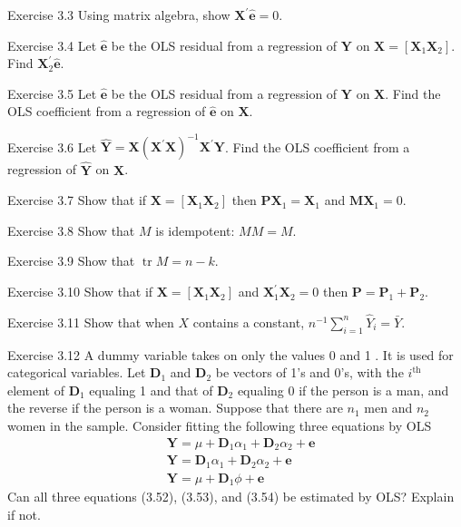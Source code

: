\documentclass[10pt]{article}
\begin{document}
Exercise 3.3 Using matrix algebra, show $\boldsymbol{X}^{\prime} \widehat{\boldsymbol{e}}=0$.

Exercise 3.4 Let $\widehat{\boldsymbol{e}}$ be the OLS residual from a regression of $\boldsymbol{Y}$ on $\boldsymbol{X}=\left[\boldsymbol{X}_{1} \boldsymbol{X}_{2}\right]$. Find $\boldsymbol{X}_{2}^{\prime} \widehat{\boldsymbol{e}}$.

Exercise 3.5 Let $\widehat{\boldsymbol{e}}$ be the OLS residual from a regression of $\boldsymbol{Y}$ on $\boldsymbol{X}$. Find the OLS coefficient from a regression of $\widehat{\boldsymbol{e}}$ on $\boldsymbol{X}$.

Exercise 3.6 Let $\widehat{\boldsymbol{Y}}=\boldsymbol{X}\left(\boldsymbol{X}^{\prime} \boldsymbol{X}\right)^{-1} \boldsymbol{X}^{\prime} \boldsymbol{Y}$. Find the OLS coefficient from a regression of $\widehat{\boldsymbol{Y}}$ on $\boldsymbol{X}$.

Exercise 3.7 Show that if $\boldsymbol{X}=\left[\boldsymbol{X}_{1} \boldsymbol{X}_{2}\right]$ then $\boldsymbol{P} \boldsymbol{X}_{1}=\boldsymbol{X}_{1}$ and $\boldsymbol{M} \boldsymbol{X}_{1}=0 .$

Exercise 3.8 Show that $M$ is idempotent: $M M=M$.

Exercise 3.9 Show that $\operatorname{tr} M=n-k$.

Exercise 3.10 Show that if $\boldsymbol{X}=\left[\boldsymbol{X}_{1} \boldsymbol{X}_{2}\right]$ and $\boldsymbol{X}_{1}^{\prime} \boldsymbol{X}_{2}=0$ then $\boldsymbol{P}=\boldsymbol{P}_{1}+\boldsymbol{P}_{2}$.

Exercise 3.11 Show that when $X$ contains a constant, $n^{-1} \sum_{i=1}^{n} \widehat{Y}_{i}=\bar{Y}$.

Exercise 3.12 A dummy variable takes on only the values 0 and 1 . It is used for categorical variables. Let $\boldsymbol{D}_{1}$ and $\boldsymbol{D}_{2}$ be vectors of 1's and 0's, with the $i^{\text {th }}$ element of $\boldsymbol{D}_{1}$ equaling 1 and that of $\boldsymbol{D}_{2}$ equaling 0 if the person is a man, and the reverse if the person is a woman. Suppose that there are $n_{1}$ men and $n_{2}$ women in the sample. Consider fitting the following three equations by OLS
$$
\begin{aligned}
&\boldsymbol{Y}=\mu+\boldsymbol{D}_{1} \alpha_{1}+\boldsymbol{D}_{2} \alpha_{2}+\boldsymbol{e} \\
&\boldsymbol{Y}=\boldsymbol{D}_{1} \alpha_{1}+\boldsymbol{D}_{2} \alpha_{2}+\boldsymbol{e} \\
&\boldsymbol{Y}=\mu+\boldsymbol{D}_{1} \phi+\boldsymbol{e}
\end{aligned}
$$
Can all three equations (3.52), (3.53), and (3.54) be estimated by OLS? Explain if not.
\end{document}
